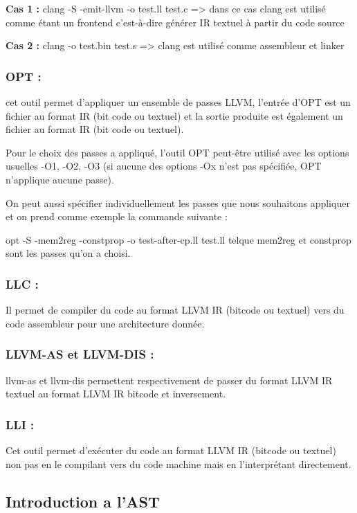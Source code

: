\documentclass[12pt,titlepage]{article}
\begin{document}
	\textbf{Cas 1 : } clang -S -emit-llvm -o test.ll test.c => dans ce cas clang est utilisé comme étant un frontend c'est-à-dire générer IR textuel à partir du code source 
      
    \textbf{Cas 2 : }clang -o test.bin test.s => clang est utilisé comme assembleur et linker 
      
      
    \subsubsection{ OPT :} cet outil permet d’appliquer un ensemble de passes LLVM, l’entrée d'OPT est un fichier au format IR (bit code ou textuel) et la sortie produite est également un fichier au format IR (bit code ou textuel).
      
Pour le choix des passes a appliqué, l’outil OPT peut-être utilisé avec les options usuelles -O1, -O2, -O3 (si aucune des options -Ox n’est pas spécifiée, OPT n’applique aucune passe).
      
      On peut aussi spécifier individuellement les passes que nous souhaitons appliquer et on prend comme exemple la commande suivante  :
      
      opt -S -mem2reg -constprop -o test-after-cp.ll test.ll
      telque mem2reg  et constprop  sont les passes qu’on a choisi.

    \subsubsection{ LLC :} Il permet de compiler du code au format LLVM IR (bitcode ou textuel) vers du code assembleur pour une architecture donnée. 
      
    \subsubsection{LLVM-AS et LLVM-DIS : } 
    
    llvm-as et llvm-dis permettent respectivement de passer du format LLVM IR textuel au format LLVM IR bitcode et inversement.

    \subsubsection{ LLI : } 
    Cet outil permet d’exécuter du code au format LLVM IR (bitcode ou textuel) non pas en le compilant vers du code machine mais en l’interprétant directement.
    
\subsection{Introduction a l'AST}
\end{document}

